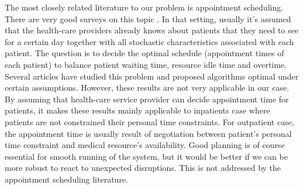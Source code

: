The most closely related literature to our problem is appointment scheduling. There are very good surveys on this topic \cite{gupta2008appointment, cayirli2003outpatient}. In that setting, usually it's assumed that the health-care providers already knows about patients that they need to see for a certain day together with all stochastic characteristics associated with each patient. The question is to decide the optimal schedule (appointment times of each patient) to balance patient waiting time, resource idle time and overtime. Several articles \cite{kaandorp2007optimal,denton2003sequential,begen2011appointment} have studied this problem and proposed algorithms optimal under certain assumptions. However, these results are not very applicable in our case. By assuming that health-care service provider can decide appointment time for patients, it makes these results mainly applicable to inpatients case where patients are not constrained their personal time constraints. For outpatient case, the appointment time is usually result of negotiation between patient's personal time constraint and medical resource's availability. Good planning is of course essential for smooth running of the system, but it would be better if we can be more robust to react to unexpected disruptions. This is not addressed by the appointment scheduling literature.
